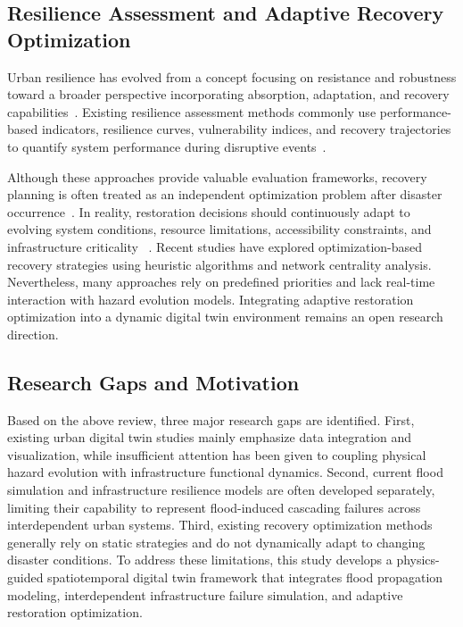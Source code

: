 \documentclass[preprint,12pt]{elsarticle}
\begin{document}
\subsection{Resilience Assessment and Adaptive Recovery Optimization}
Urban resilience has evolved from a concept focusing on resistance and
robustness toward a broader perspective incorporating absorption, adaptation,
and recovery capabilities~\cite{holling1973resilience,bruneau2003framework}.
Existing resilience assessment methods commonly use performance-based
indicators, resilience curves, vulnerability indices, and recovery
trajectories to quantify system performance during disruptive
events~\cite{chang2004measuring,ouyang2012three}.

Although these approaches provide valuable evaluation frameworks, recovery
planning is often treated as an independent optimization problem after
disaster occurrence~\cite{ouyang2012time}. In reality, restoration decisions
should continuously adapt to evolving system conditions, resource
limitations, accessibility constraints, and infrastructure criticality
~\cite{laporte2009fifty}. Recent studies have explored optimization-based
recovery strategies using heuristic algorithms and network centrality
analysis. Nevertheless, many approaches rely on predefined priorities and
lack real-time interaction with hazard evolution models. Integrating adaptive
restoration optimization into a dynamic digital twin environment remains an
open research direction.

\subsection{Research Gaps and Motivation}
Based on the above review, three major research gaps are identified. First,
existing urban digital twin studies mainly emphasize data integration and
visualization, while insufficient attention has been given to coupling
physical hazard evolution with infrastructure functional dynamics. Second,
current flood simulation and infrastructure resilience models are often
developed separately, limiting their capability to represent flood-induced
cascading failures across interdependent urban systems. Third, existing
recovery optimization methods generally rely on static strategies and do not
dynamically adapt to changing disaster conditions. To address these
limitations, this study develops a physics-guided spatiotemporal digital twin
framework that integrates flood propagation modeling, interdependent
infrastructure failure simulation, and adaptive restoration optimization.
\end{document}
